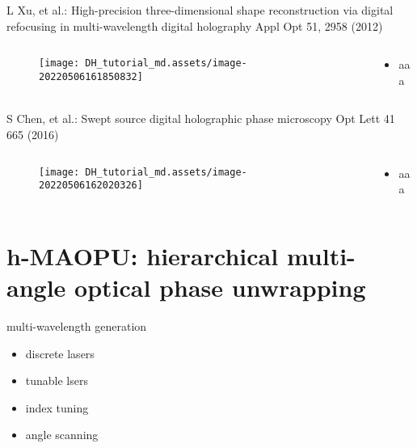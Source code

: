 \documentclass[t, aspectratio=169]{beamer}
\begin{document}
\begin{frame}{L Xu, et al.: High-precision three-dimensional shape reconstruction via digital refocusing in multi-wavelength digital holography}
	\vspace{-3 mm}
	\small Appl Opt 51, 2958 (2012)
	\begin{columns}
		\begin{column}{.6\textwidth}
			\begin{figure}
				\texttt{[image: DH\_tutorial\_md.assets/image-20220506161850832]}
			\end{figure}
		\end{column}
		\begin{column}{.4\textwidth}
			\begin{itemize}
				\item aaa
			\end{itemize}
		\end{column}
	\end{columns}
\end{frame}


\begin{frame}{S Chen, et al.: Swept source digital holographic phase microscopy}
	\vspace{-3 mm}
	\small Opt Lett 41 665 (2016)
	\begin{columns}
		\begin{column}{.6\textwidth}
			\begin{figure}
				\texttt{[image: DH\_tutorial\_md.assets/image-20220506162020326]}
			\end{figure}
		\end{column}
		\begin{column}{.4\textwidth}
			\begin{itemize}
				\item aaa
			\end{itemize}
		\end{column}
	\end{columns}
\end{frame}


\section{h-MAOPU: hierarchical multi-angle optical phase unwrapping}
\begin{frame}[c]
	\centering\LARGE\textbf{\secname}
\end{frame}


\begin{frame}{multi-wavelength generation}
	\begin{itemize}
		\item discrete lasers
		\item tunable lsers
		\item index tuning
		\item angle scanning
	\end{itemize}
\end{frame}
\end{document}
